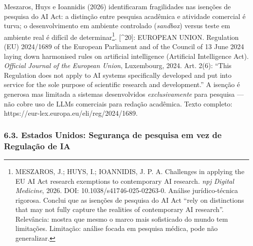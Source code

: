 \documentclass[
  12pt,
  a4paper,
  brazil
]{article}
\begin{document}
Meszaros, Huys e Ioannidis (2026) identificaram fragilidades nas
isenções de pesquisa do AI Act: a distinção entre pesquisa acadêmica e
atividade comercial é turva; o desenvolvimento em ambiente controlado
(\emph{sandbox}) versus teste em ambiente real é difícil de
determinar\footnote{MESZAROS, J.; HUYS, I.; IOANNIDIS, J. P. A.
  Challenges in applying the EU AI Act research exemptions to
  contemporary AI research. \emph{npj Digital Medicine}, 2026. DOI:
  10.1038/s41746-025-02263-0. Análise jurídico-técnica rigorosa. Conclui
  que as isenções de pesquisa do AI Act ``rely on distinctions that may
  not fully capture the realities of contemporary AI research''.
  Relevância: mostra que mesmo o marco mais sofisticado do mundo tem
  limitações. Limitação: análise focada em pesquisa médica, pode não
  generalizar.}. {[}\^{}20{]}: EUROPEAN UNION. Regulation (EU) 2024/1689
of the European Parliament and of the Council of 13 June 2024 laying
down harmonised rules on artificial intelligence (Artificial
Intelligence Act). \emph{Official Journal of the European Union},
Luxembourg, 2024. Art. 2(6): ``This Regulation does not apply to AI
systems specifically developed and put into service for the sole purpose
of scientific research and development.'' A isenção é generosa mas
limitada a sistemas desenvolvidos \emph{exclusivamente} para pesquisa
--- não cobre uso de LLMs comerciais para redação acadêmica. Texto
completo: https://eur-lex.europa.eu/eli/reg/2024/1689.

\subsubsection{6.3. Estados Unidos: Segurança de pesquisa em vez de
Regulação de
IA}\label{estados-unidos-seguranuxe7a-de-pesquisa-em-vez-de-regulauxe7uxe3o-de-ia}
\end{document}
